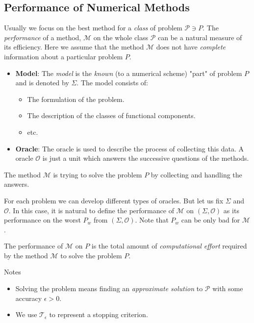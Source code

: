 \subsection{Performance of Numerical Methods}\label{subsec:performance_of_numerical_performance}
Usually we focus on the best method for a \emph{class} of problem \(\mathscr{P} \ni P\). The \emph{performance} of a method, \(\mathscr{M}\) on the whole class \(\mathscr{P}\) can be a natural measure of its efficiency. Here we assume that the method \(\mathscr{M}\) does not have \emph{complete} information about a particular problem \(P\).
\begin{itemize}
    \item \textbf{Model}: The \emph{model} is the \emph{known} (to a numerical scheme) "part" of problem \(P\) and is denoted by \(\Sigma\). The model consists of:
        \begin{itemize}
            \item The formulation of the problem.
            \item The description of the classes of functional components.
            \item etc.
        \end{itemize}    
    \item \textbf{Oracle}: The oracle is used to describe the process of collecting this data. A oracle \(\mathcal{O}\) is just a unit which answers the successive questions of the methods.
\end{itemize}
The method \(\mathscr{M}\) is trying to solve the problem \(P\) by collecting and handling the answers. 

For each problem we can develop different types of oracles. But let us fix \(\Sigma\) and \(\mathcal{O}\). In this case, it is natural to define the performance of \(\mathscr{M}\) on \((\Sigma, \mathcal{O})\) as its performance on the worst \(P_w\) from \((\Sigma, \mathcal{O})\). Note that \(P_w\) can be only bad for \(\mathscr{M}\).

\begin{defn}[Performance]\label{defn:performance}
    The performance of \(\mathscr{M}\) on \(P\) is the total amount of \emph{computational effort} required by the method \(\mathscr{M}\) to solve the problem \(P\).
\end{defn}

\begin{note}{Notes}
    \begin{itemize}
        \item Solving the problem means finding an \emph{approximate solution} to \(\mathscr{P}\) with some accuracy \(\epsilon > 0\). 
        \item We use \(\mathscr{T}_\epsilon\) to represent a stopping criterion.
    \end{itemize}
\end{note}

